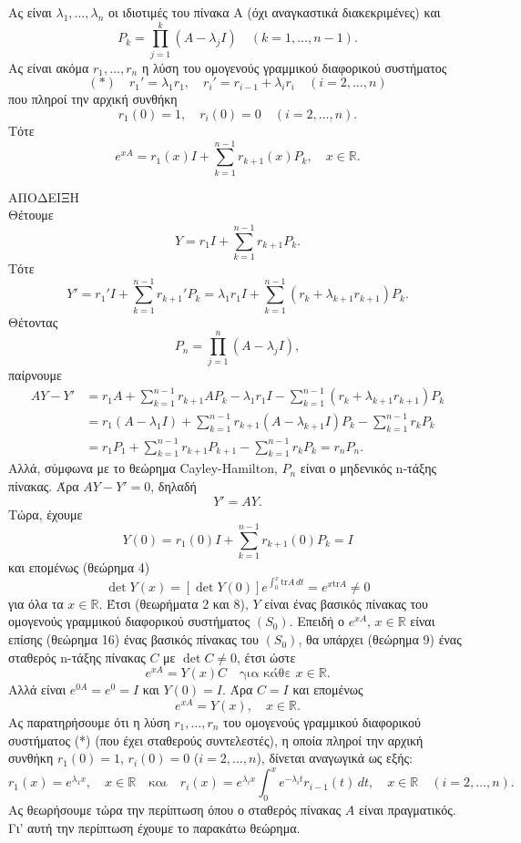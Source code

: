 \documentclass[11pt,a4paper,twoside]{book}
\newcommand{\titlefont}[1]{{\fontfamily{maksf}\selectfont #1}}
\newcounter{thewrhma}[chapter]
\renewcommand{\thethewrhma}{\thechapter.\arabic{thewrhma}}
\newcommand{\thewr}{\refstepcounter{thewrhma}{\bf\titlefont{\textcolor{secondarycolor}{\large Θεώρημα\hspace{2mm}\thethewrhma}}}\hspace{1mm}}{}
\newenvironment{Thewrhma}[1]
{\begin{tcolorbox}[title=\thewr\ \ :\ \  {\textcolor{black}{\bf{\large\titlefont{#1}}}},
breakable,
enhanced standard,
titlerule=-.2pt,
toprule=0pt, 
rightrule=0pt, 
bottomrule=0pt,
colback=white,
left=2mm,
top=1mm,
bottom=0mm,
boxrule=0pt,
colframe=white,
borderline west={1.5mm}{0pt}{secondarycolor},
leftrule=2mm,
sharp corners,
coltitle=secondarycolor]}
{\end{tcolorbox}}
\newcommand{\eng}[1]{\selectlanguage{english}#1\selectlanguage{greek}}
\begin{document}
\begin{Thewrhma}{17 (\eng{Putzer})}
Ας είναι $\lambda_1, \dots, \lambda_n$ οι ιδιοτιμές του πίνακα Α (όχι αναγκαστικά διακεκριμένες) και
\[
P_k = \prod_{j=1}^{k} (A - \lambda_j I) \quad (k=1, \dots, n-1).
\]
Ας είναι ακόμα $r_1, \dots, r_n$ η λύση του ομογενούς γραμμικού διαφορικού συστήματος
\[
(*) \quad r_1' = \lambda_1 r_1, \quad r_i' = r_{i-1} + \lambda_i r_i \quad (i=2, \dots, n)
\]
που πληροί την αρχική συνθήκη
\[
r_1(0) = 1, \quad r_i(0) = 0 \quad (i=2, \dots, n).
\]
Τότε
\[
e^{xA} = r_1(x)I + \sum_{k=1}^{n-1} r_{k+1}(x)P_k, \quad x \in \mathbb{R}.
\]
\end{Thewrhma}

ΑΠΟΔΕΙΞΗ\\
Θέτουμε
\[
Y = r_1 I + \sum_{k=1}^{n-1} r_{k+1} P_k.
\]
Τότε
\[
Y' = r_1' I + \sum_{k=1}^{n-1} r_{k+1}' P_k = \lambda_1 r_1 I + \sum_{k=1}^{n-1} (r_k + \lambda_{k+1} r_{k+1}) P_k.
\]
Θέτοντας
\[
P_n = \prod_{j=1}^{n} (A - \lambda_j I),
\]
παίρνουμε
\begin{align*}
AY - Y' &= r_1 A + \sum_{k=1}^{n-1} r_{k+1} A P_k - \lambda_1 r_1 I - \sum_{k=1}^{n-1} (r_k + \lambda_{k+1} r_{k+1}) P_k \\
&= r_1(A - \lambda_1 I) + \sum_{k=1}^{n-1} r_{k+1} (A - \lambda_{k+1} I) P_k - \sum_{k=1}^{n-1} r_k P_k \\
&= r_1 P_1 + \sum_{k=1}^{n-1} r_{k+1} P_{k+1} - \sum_{k=1}^{n-1} r_k P_k = r_n P_n.
\end{align*}
Αλλά, σύμφωνα με το θεώρημα \eng{Cayley-Hamilton}, $P_n$ είναι ο μηδενικός n-τάξης πίνακας. Άρα $AY-Y'=0$, δηλαδή
\[
Y' = AY.
\]
Τώρα, έχουμε
\[
Y(0) = r_1(0)I + \sum_{k=1}^{n-1} r_{k+1}(0)P_k = I
\]
και επομένως (θεώρημα 4)
\[
\det Y(x) = [\det Y(0)] e^{\int_0^x \text{tr}A \, dt} = e^{x\text{tr}A} \neq 0
\]
για όλα τα $x \in \mathbb{R}$. Έτσι (θεωρήματα 2 και 8), $Y$ είναι ένας βασικός πίνακας του ομογενούς γραμμικού διαφορικού συστήματος $(S_0)$. Επειδή ο $e^{xA}$, $x \in \mathbb{R}$ είναι επίσης (θεώρημα 16) ένας βασικός πίνακας του $(S_0)$, θα υπάρχει (θεώρημα 9) ένας σταθερός n-τάξης πίνακας $C$ με $\det C \neq 0$, έτσι ώστε
\[
e^{xA} = Y(x)C \quad \text{για κάθε } x \in \mathbb{R}.
\]
Αλλά είναι $e^{0A} = e^0 = I$ και $Y(0)=I$. Άρα $C=I$ και επομένως
\[
e^{xA} = Y(x), \quad x \in \mathbb{R}.
\]
Ας παρατηρήσουμε ότι η λύση $r_1, \dots, r_n$ του ομογενούς γραμμικού διαφορικού συστήματος (*) (που έχει σταθερούς συντελεστές), η οποία πληροί την αρχική συνθήκη $r_1(0)=1$, $r_i(0)=0$ ($i=2, \dots, n$), δίνεται αναγωγικά ως εξής:
\[
r_1(x) = e^{\lambda_1 x}, \quad x \in \mathbb{R} \quad \text{και} \quad r_i(x) = e^{\lambda_i x} \int_0^x e^{-\lambda_i t} r_{i-1}(t) \, dt, \quad x \in \mathbb{R} \quad (i=2, \dots, n).
\]
Ας θεωρήσουμε τώρα την περίπτωση όπου ο σταθερός πίνακας $Α$ είναι πραγματικός. Γι' αυτή την περίπτωση έχουμε το παρακάτω θεώρημα.
\end{document}

